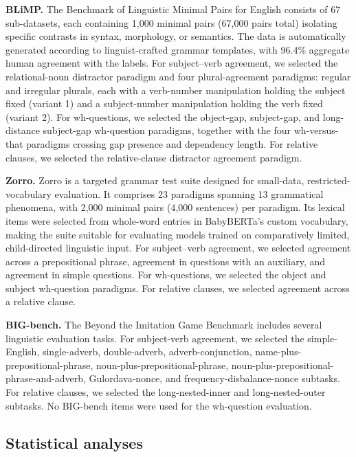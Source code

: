 \textbf{BLiMP.} The Benchmark of Linguistic Minimal Pairs for English \citep{warstadt2020blimp} consists of 67 sub-datasets, each containing 1,000 minimal pairs (67,000 pairs total) isolating specific contrasts in syntax, morphology, or semantics. The data is automatically generated according to linguist-crafted grammar templates, with 96.4\% aggregate human agreement with the labels. For subject--verb agreement, we selected the relational-noun distractor paradigm and four plural-agreement paradigms: regular and irregular plurals, each with a verb-number manipulation holding the subject fixed (variant 1) and a subject-number manipulation holding the verb fixed (variant 2). For wh-questions, we selected the object-gap, subject-gap, and long-distance subject-gap wh-question paradigms, together with the four wh-versus-that paradigms crossing gap presence and dependency length. For relative clauses, we selected the relative-clause distractor agreement paradigm.

 
\textbf{Zorro.} Zorro \citep{huebner2021babyberta} is a targeted grammar test suite designed for small-data, restricted-vocabulary evaluation. It comprises 23 paradigms spanning 13 grammatical phenomena, with 2,000 minimal pairs (4,000 sentences) per paradigm. Its lexical items were selected from whole-word entries in BabyBERTa's custom vocabulary, making the suite suitable for evaluating models trained on comparatively limited, child-directed linguistic input. For subject--verb agreement, we selected agreement across a prepositional phrase, agreement in questions with an auxiliary, and agreement in simple questions. For wh-questions, we selected the object and subject wh-question paradigms. For relative clauses, we selected agreement across a relative clause.


\textbf{BIG-bench.} The Beyond the Imitation Game Benchmark \citep{srivastava2023beyond} includes several linguistic evaluation tasks. For subject-verb agreement, we selected the simple-English, single-adverb, double-adverb, adverb-conjunction, name-plus-prepositional-phrase, noun-plus-prepositional-phrase, noun-plus-prepositional-phrase-and-adverb, Gulordava-nonce, and frequency-disbalance-nonce subtasks. For relative clauses, we selected the long-nested-inner and long-nested-outer subtasks. No BIG-bench items were used for the wh-question evaluation.


\subsection{Statistical analyses}
\label{app:stats}

